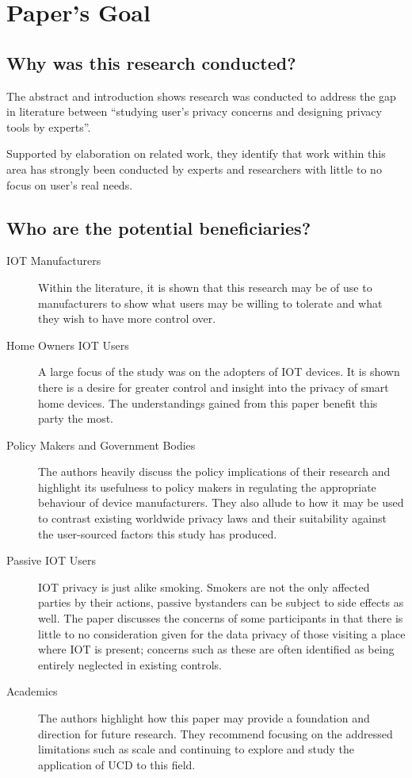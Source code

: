 \section{Paper's Goal}
\subsection{Why was this research conducted?}

The abstract and introduction shows research was conducted to address the gap in literature between ``studying user's privacy concerns and designing privacy tools by experts''.

Supported by elaboration on related work, they identify that work within this area has strongly been conducted by experts and researchers with little to no focus on user's real needs. 
\subsection{Who are the potential beneficiaries?}

\begin{description}
	\item[IOT Manufacturers] Within the literature, it is shown that this research may be of use to manufacturers to show what users may be willing to tolerate and what they wish to have more control over.
	
	\item[Home Owners IOT Users] A large focus of the study was on the adopters of IOT devices. It is shown there is a desire for greater control and insight into the privacy of smart home devices. The understandings gained from this paper benefit this party the most.
	
	\item[Policy Makers and Government Bodies] The authors heavily discuss the policy implications of their research and highlight its usefulness to policy makers in regulating the appropriate behaviour of device manufacturers. They also allude to how it may be used to contrast existing worldwide privacy laws and their suitability against the user-sourced factors this study has produced. 
	
	\item[Passive IOT Users] IOT privacy is just alike smoking. Smokers are not the only affected parties by their actions, passive bystanders can be subject to side effects as well. The paper discusses the concerns of some participants in that there is little to no consideration given for the data privacy of those visiting a place where IOT is present; concerns such as these are often identified as being entirely neglected in existing controls.
	
	\item[Academics] The authors highlight how this paper may provide a foundation and direction for future research. They recommend focusing on the addressed limitations such as scale and continuing to explore and study the application of UCD to this field.
\end{description}

